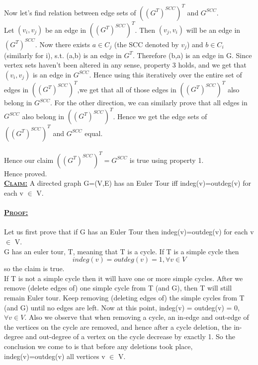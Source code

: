 \documentclass[a4 paper]{article}
\begin{document}
Now let's find relation between edge sets of $((G^{T})^{SCC})^{T}$ and $G^{SCC}$.\\
Let $(v_{i},v_{j})$ be an edge in $((G^{T})^{SCC})^{T}$. Then $(v_{j},v_{i})$ will be an edge in $(G^{T})^{SCC}$. Now there exists $a \in C_{j}$ (the SCC denoted by $v_{j}$)  and $b \in C_{i}$ (similarly for i), s.t. (a,b) is an edge in $G^{T}$. Therefore (b,a) is an edge in G. Since vertex sets haven't been altered in any sense, property 3 holds, and we get that $(v_{i},v_{j})$ is an edge in $G^{SCC}$. Hence using this iteratively over the entire set of edges in $((G^{T})^{SCC})^{T}$,we get that all of those edges in $((G^{T})^{SCC})^{T}$ also belong in $G^{SCC}$. For the other direction, we can similarly prove that all edges in $G^{SCC}$ also belong in $((G^{T})^{SCC})^{T}$. Hence we get the edge sets of $((G^{T})^{SCC})^{T}$ and $G^{SCC}$ equal.\\\\
Hence our claim $((G^{T})^{SCC})^{T} = G^{SCC}$ is true using property 1.\\
Hence proved.\\
\newpage
{}
\textbf{\underline{\textsc{Claim:}}} A directed graph G=(V,E) has an Euler Tour iff indeg(v)=outdeg(v) for each v $\in$ V.\\\\
\textbf{\underline{\textsc{Proof:}}}\\\\
Let us first prove that if G has an Euler Tour then indeg(v)=outdeg(v) for each v $\in$ V.\\ G has an euler tour, T, meaning that T is a cycle. If T is a simple cycle then$$ indeg(v) = outdeg(v) = 1,\forall v \in V$$ so the claim is true.\\
If T is not a simple cycle then it will have one or more simple cycles. After we remove (delete edges of) one simple cycle from T (and G), then T will still remain Euler tour. Keep removing (deleting edges of) the simple cycles from T (and G) until no edges are left. Now at this point, indeg(v) = outdeg(v) = 0, $\forall v \in V$. Also we observe that when removing a cycle, an in-edge and out-edge of the vertices on the cycle are removed, and hence after a cycle deletion, the in-degree and out-degree of a vertex on the cycle decrease by exactly 1. So the conclusion we come to is that before any deletions took place, indeg(v)=outdeg(v) all vertices v $\in$ V.\\\\
\end{document}
